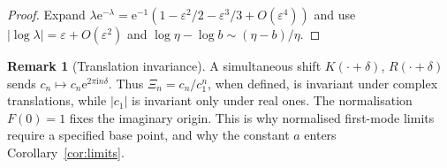 \documentclass[11pt]{amsart}
\theoremstyle{definition}
\newtheorem{remark}[theorem]{Remark}
\newcommand{\Rr}{R}
\newcommand{\Kk}{K}
\newcommand{\eee}{\mathrm{e}}
\newcommand{\ii}{\mathrm{i}}
\begin{document}
\begin{proof}
Expand $\lambda\eee^{-\lambda}=\eee^{-1}(1-\varepsilon^2/2-\varepsilon^3/3+O(\varepsilon^4))$ and use
$|\log\lambda|=\varepsilon+O(\varepsilon^2)$ and $\log\eta-\log b\sim(\eta-b)/\eta$.
\end{proof}

\begin{remark}[Translation invariance]\label{rem:invariance}
A simultaneous shift $\Kk(\cdot+\delta)$, $\Rr(\cdot+\delta)$ sends
$c_n\mapsto c_n\eee^{2\pi\ii n\delta}$.  Thus $\Xi_n=c_n/c_1^n$, when
defined, is invariant under complex translations, while $|c_1|$ is invariant
only under real ones.
The normalisation $F(0)=1$ fixes the imaginary origin.  This is why
normalised first-mode limits require a specified base point, and why the
constant $a$ enters Corollary~\ref{cor:limits}.
\end{remark}
\end{document}
